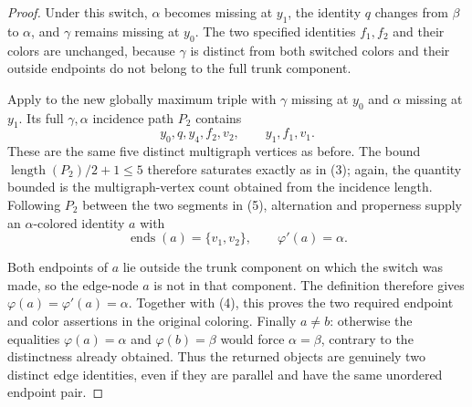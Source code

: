 \begin{proof}
Under this switch, $\alpha$ becomes missing at $y_1$, the identity $q$
changes from $\beta$ to $\alpha$, and $\gamma$ remains missing at $y_0$.
The two specified identities $f_1,f_2$ and their colors are unchanged,
because $\gamma$ is distinct from both switched colors and their outside
endpoints do not belong to the full trunk component.

Apply  to the new globally maximum
triple with $\gamma$ missing at $y_0$ and $\alpha$ missing at $y_1$.  Its
full $\gamma,\alpha$ incidence path $P_2$ contains
\[
 y_0,q,y_4,f_2,v_2,
 \qquad y_1,f_1,v_1.                                 \tag{5}
\]
These are the same five distinct multigraph vertices as before.  The bound
$\operatorname{length}(P_2)/2+1\leq5$ therefore saturates exactly as in
(3); again, the quantity bounded is the multigraph-vertex count obtained
from the incidence length.  Following $P_2$ between the two segments in
(5), alternation and properness supply an $\alpha$-colored identity $a$
with
\[
 \operatorname{ends}(a)=\{v_1,v_2\},
 \qquad \varphi'(a)=\alpha.                          \tag{6}
\]

Both endpoints of $a$ lie outside the trunk component on which the switch
was made, so the edge-node $a$ is not in that component.  The definition
 therefore gives
$\varphi(a)=\varphi'(a)=\alpha$.  Together with (4), this proves the two
required endpoint and color assertions in the original coloring.  Finally
$a\ne b$: otherwise the equalities
$\varphi(a)=\alpha$ and $\varphi(b)=\beta$ would force
$\alpha=\beta$, contrary to the distinctness already obtained.  Thus the
returned objects are genuinely two distinct edge identities, even if they
are parallel and have the same unordered endpoint pair.
\end{proof}
